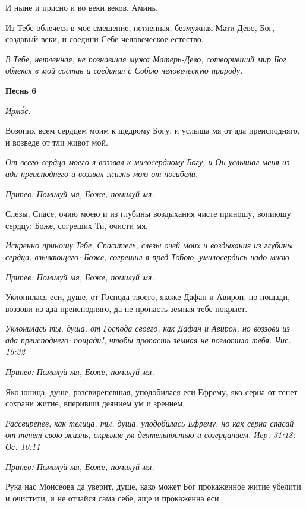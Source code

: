 И ныне и присно и во веки веков. Аминь.


Из Тебе облечеся в мое смешение, нетленная, безмужная Мати Дево, Бог, создавый веки, и соедини Себе человеческое естество.


\itshape В Тебе, нетленная, не познавшая мужа Матерь-Дево, сотворивший мир Бог облекся в мой состав и соединил с Собою человеческую природу.\normalfont{}





\bfseries Песнь 6\normalfont{}


\itshape Ирмо́с:\normalfont{}


Возопих всем сердцем моим к щедрому Богу, и услыша мя от ада преисподняго, и возведе от тли живот мой.


\itshape От всего сердца моего я воззвал к милосердному Богу, и Он услышал меня из ада преисподнего и воззвал жизнь мою от погибели.\normalfont{}


\itshape Припев:\normalfont{} Помилуй мя, Боже, помилуй мя.


Слезы, Спасе, очию моею и из глубины воздыхания чисте приношу, вопиющу сердцу: Боже, согреших Ти, очисти мя.


\itshape Искренно приношу Тебе, Спаситель, слезы очей моих и воздыхания из глубины сердца, взывающего: Боже, согрешил я пред Тобою, умилосердись надо мною.\normalfont{}


\itshape Припев:\normalfont{} Помилуй мя, Боже, помилуй мя.


Уклонилася еси, душе, от Господа твоего, якоже Дафан и Авирон, но пощади, воззови из ада преисподняго, да не пропасть земная тебе покрыет.


\itshape Уклонилась ты, душа, от Господа своего, как Дафан и Авирон, но воззови из ада преисподнего: пощади!, чтобы пропасть земная не поглотила тебя. Чис. 16:32\normalfont{}


\itshape Припев:\normalfont{} Помилуй мя, Боже, помилуй мя.


Яко юница, душе, разсвирепевшая, уподобилася еси Ефрему, яко серна от тенет сохрани житие, вперивши деянием ум и зрением.


\itshape Рассвирепев, как телица, ты, душа, уподобилась Ефрему, но как серна спасай от тенет свою жизнь, окрылив ум деятельностью и созерцанием. Иер. 31:18; Ос. 10:11\normalfont{}


\itshape Припев:\normalfont{} Помилуй мя, Боже, помилуй мя.


Рука нас Моисеова да уверит, душе, како может Бог прокаженное житие убелити и очистити, и не отчайся сама себе, аще и прокаженна еси.


